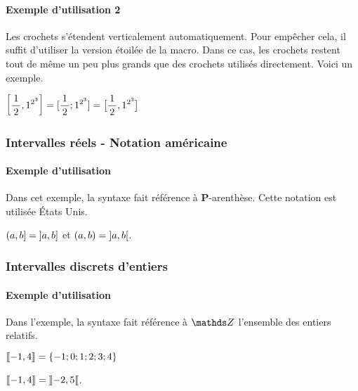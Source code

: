 \documentclass[12pt,a4paper]{article}
\theoremstyle{definition}
\begin{document}
\paragraph{Exemple d'utilisation 2}

Les crochets s'étendent verticalement automatiquement. Pour empêcher cela, il suffit d'utiliser la version étoilée de la macro.
Dans ce cas, les crochets restent tout de même un peu plus grands que des crochets utilisés directement. Voici un exemple.

\begin{latexex}
$\displaystyle
 \intervalC{ \frac{1}{2} }{ 1^{2^{3}} }
 =
 [ \frac{1}{2} ; 1^{2^{3}} ]
 =
 \intervalC*{ \frac{1}{2} }{ 1^{2^{3}} }$
\end{latexex}




\subsubsection{Intervalles réels - Notation américaine}

\paragraph{Exemple d'utilisation}

Dans cet exemple, la syntaxe fait référence à \textbf{P}-arenthèse. Cette notation est utilisée États Unis.

\begin{latexex}
$\intervalPC{a}{b} = \intervalOC{a}{b}$ et
$\intervalP{a}{b} = \intervalO{a}{b}$.
\end{latexex}




\subsubsection{Intervalles discrets d'entiers}

\paragraph{Exemple d'utilisation}

Dans l'exemple, la syntaxe fait référence à $\ZZ$ l'ensemble des entiers relatifs.

\begin{latexex}
$\ZintervalC{-1}{4} 
 = \{ -1 ; 0 ; 1 ; 2 ; 3 ; 4 \}$
 
$\ZintervalC{-1}{4} 
 = \ZintervalO{-2}{5}$.
\end{latexex}
\end{document}
